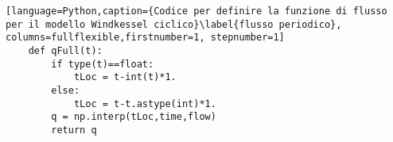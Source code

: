 \begin{lstlisting}[language=Python,caption={Codice per definire la funzione di flusso per il modello Windkessel ciclico}\label{flusso periodico}, columns=fullflexible,firstnumber=1, stepnumber=1]
    def qFull(t):
        if type(t)==float:
            tLoc = t-int(t)*1.
        else:
            tLoc = t-t.astype(int)*1.
        q = np.interp(tLoc,time,flow)
        return q
\end{lstlisting}
